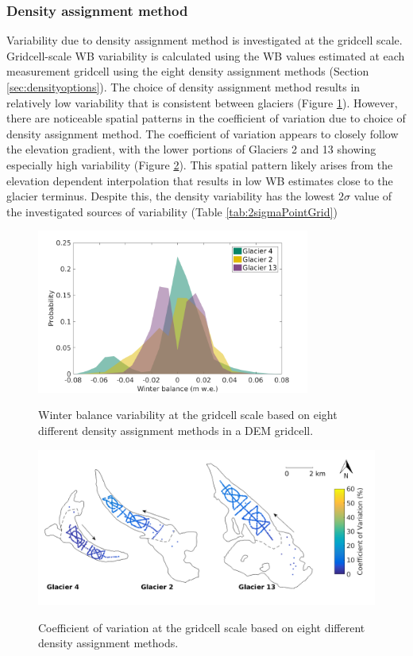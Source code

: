 \documentclass{sfuthesis}
\begin{document}
\subsubsection{Density assignment method}

Variability due to density assignment method is investigated at the gridcell scale. Gridcell-scale WB variability is calculated using the WB values estimated at each measurement gridcell using the eight density assignment methods (Section \ref{sec:densityoptions}). The choice of density assignment method results in relatively low variability that is consistent between glaciers (Figure \ref{fig:SWEvar_Density_hist}). However, there are noticeable spatial patterns in the coefficient of variation due to choice of density assignment method. The coefficient of variation appears to closely follow the elevation gradient, with the lower portions of Glaciers 2 and 13 showing especially high variability (Figure \ref{fig:SWEvar_Density_map}). This spatial pattern likely arises from the elevation dependent interpolation that results in low WB estimates close to the glacier terminus. Despite this, the density variability has the lowest $2\sigma$ value of the investigated sources of variability (Table  \ref{tab:2sigmaPointGrid})

\begin{figure}[H]
	\centering
	\includegraphics[width =0.8\textwidth]{SWEvarDensityHIST.png}\\
	\caption{Winter balance variability at the gridcell scale based on eight different density assignment methods in a DEM gridcell.}
	\label{fig:SWEvar_Density_hist}
\end{figure}

\begin{figure}[H]
	\centering
	\includegraphics[width =\textwidth]{Map_cellstd_density.png}\\
	\caption{Coefficient of variation at the gridcell scale based on eight different density assignment methods.}
	\label{fig:SWEvar_Density_map}
\end{figure}
\end{document}

